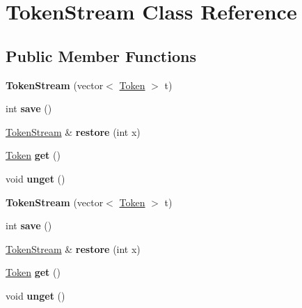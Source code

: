 \hypertarget{class_token_stream}{\section{Token\-Stream Class Reference}
\label{class_token_stream}
}
\subsection*{Public Member Functions}
\begin{DoxyCompactItemize}
\item 
\hypertarget{class_token_stream_adf083c4f320b509b3731c9a80d11d604}{{\bfseries Token\-Stream} (vector$<$ \hyperlink{struct_token}{Token} $>$ t)}\label{class_token_stream_adf083c4f320b509b3731c9a80d11d604}

\item 
\hypertarget{class_token_stream_a7e9d09b29eff9cc01ae9749e0ef64297}{int {\bfseries save} ()}\label{class_token_stream_a7e9d09b29eff9cc01ae9749e0ef64297}

\item 
\hypertarget{class_token_stream_a7a7e660800b653145a349255ddaa0537}{\hyperlink{class_token_stream}{Token\-Stream} \& {\bfseries restore} (int x)}\label{class_token_stream_a7a7e660800b653145a349255ddaa0537}

\item 
\hypertarget{class_token_stream_ab54e9e22c60d1ae65af7bb707cd1afac}{\hyperlink{struct_token}{Token} {\bfseries get} ()}\label{class_token_stream_ab54e9e22c60d1ae65af7bb707cd1afac}

\item 
\hypertarget{class_token_stream_a8217fb6decbb196947f7f9f2ed38eaf6}{void {\bfseries unget} ()}\label{class_token_stream_a8217fb6decbb196947f7f9f2ed38eaf6}

\item 
\hypertarget{class_token_stream_adf083c4f320b509b3731c9a80d11d604}{{\bfseries Token\-Stream} (vector$<$ \hyperlink{struct_token}{Token} $>$ t)}\label{class_token_stream_adf083c4f320b509b3731c9a80d11d604}

\item 
\hypertarget{class_token_stream_a7e9d09b29eff9cc01ae9749e0ef64297}{int {\bfseries save} ()}\label{class_token_stream_a7e9d09b29eff9cc01ae9749e0ef64297}

\item 
\hypertarget{class_token_stream_a7a7e660800b653145a349255ddaa0537}{\hyperlink{class_token_stream}{Token\-Stream} \& {\bfseries restore} (int x)}\label{class_token_stream_a7a7e660800b653145a349255ddaa0537}

\item 
\hypertarget{class_token_stream_ab54e9e22c60d1ae65af7bb707cd1afac}{\hyperlink{struct_token}{Token} {\bfseries get} ()}\label{class_token_stream_ab54e9e22c60d1ae65af7bb707cd1afac}

\item 
\hypertarget{class_token_stream_a8217fb6decbb196947f7f9f2ed38eaf6}{void {\bfseries unget} ()}\label{class_token_stream_a8217fb6decbb196947f7f9f2ed38eaf6}

\end{DoxyCompactItemize}
